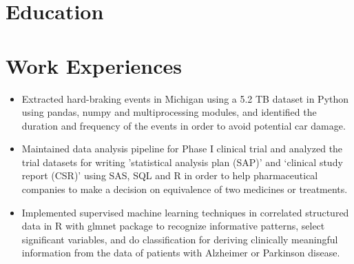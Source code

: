 \documentclass[10pt,letterpaper,sans]{moderncv}        %
\begin{document}

\makecvtitle
\vspace{-0.5cm}

\section{Education}
\vspace{1pt}




\section{Work Experiences}
\vspace{1pt}

{
\begin{itemize}
\item Extracted hard-braking events in Michigan using a 5.2 TB dataset in Python using pandas, numpy and multiprocessing modules, and identified the duration and frequency of the events in order to avoid potential car damage.
\end{itemize}
\vspace{3pt}
}

{
\begin{itemize}
\item Maintained data analysis pipeline for Phase I clinical trial and analyzed the trial datasets for writing 'statistical analysis plan (SAP)' and ‘clinical study report (CSR)’ using SAS, SQL and R in order to help pharmaceutical companies to make a decision on equivalence of two medicines or treatments.
\end{itemize}
}
\vspace{3pt}

{
\begin{itemize}
\item Implemented supervised machine learning techniques in correlated structured data in R with glmnet package
to recognize informative patterns, select significant variables, and do classification for deriving clinically meaningful information from the data of patients with Alzheimer or Parkinson disease.
\end{itemize}
} 
\vspace{3pt}
\end{document}
